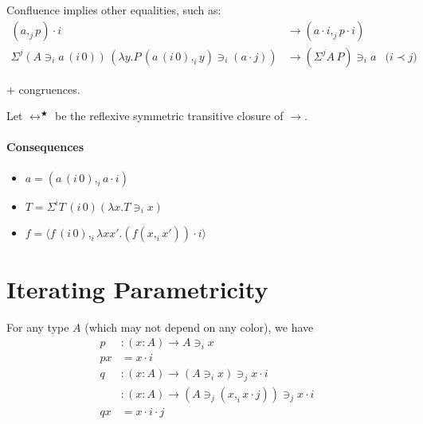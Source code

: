 \documentclass{PaperTools/latex/llncs}
\newcommand\CP[3]{(#2,_{#1} #3)}
\newcommand\CSig[1]{\Sigma^{#1}}
\newcommand\param[1]{\!\cdot\!#1}
\newcommand\op[1]{∋_{#1}}
\newcommand\ip[3]{Σ^{#1} {#2}\,{#3}}
\newcommand\fp[3]{⟨#2 ,_{#1} #3⟩}
\newcommand\mor[2]{{#1}\,{#2}}
\newcommand\proj[2]{\mor{#2}{(#1\,0)}}
\begin{document}
Confluence implies other equalities, such as:
\begin{align*}
  {(a,_j p)} \param i &→ (a \param i ,_j p \param i)\\
  \ip j {(A \op i {\proj i a})} {(λy. P \, \CP i {\proj i a} y \op i {(a \param j)})} &→ {(\ip j A P)} \op i a &\text{($i \prec j$)}
\end{align*}

+ congruences.

\begin{definition}[Conversion]
  Let $↔^★$ be the reflexive symmetric transitive closure of $→$.
\end{definition}

\paragraph{Consequences}
\begin{corollary}
  \begin{itemize}
  \item $a = \CP i {\proj i a} {a \param i}$
  \item $T = \CSig i {\proj i T} {(λx. T \op i x)}$
  \item $f = \fp i {\proj i f} {λx x'. (f \CP i x {x'}) \param i}$
  \end{itemize}
\end{corollary}

\section{Iterating Parametricity}
For any type $A$ (which may not depend on any color), we have
\begin{align*}
p &: (x:A) → A \op i x\\
p x &= x\param i\\
q &: (x:A) → (A \op i x) \op j x \param  i\\
  &: (x:A) → (A \op j \CP i x {x \param j}) \op j x \param  i\\
q x &= x\param i\param j
\end{align*}
\end{document}
